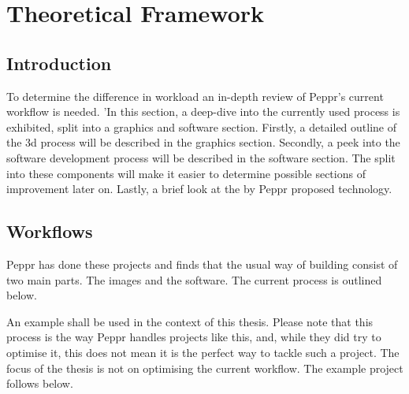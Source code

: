 %
\chapter{Theoretical Framework}

\section{Introduction}
To determine the difference in workload an in-depth review of Peppr's current workflow is needed. 'In this section, a deep-dive into the currently used process is exhibited, split into a graphics and software section. Firstly, a detailed outline of the 3d process will be described in the graphics section. Secondly, a peek into the software development process will be described in the software section. The split into these components will make it easier to determine possible sections of improvement later on.
Lastly, a brief look at the by Peppr proposed technology.

\clearpage
\section{Workflows}
Peppr has done these projects and finds that the usual way of building consist of two main parts. The images and the software. The current process is outlined below. 

An example shall be used in the context of this thesis. Please note that this process is the way Peppr handles projects like this, and, while they did try to optimise it, this does not mean it is the perfect way to tackle such a project. The focus of the thesis is not on optimising the current workflow. The example project follows below.



